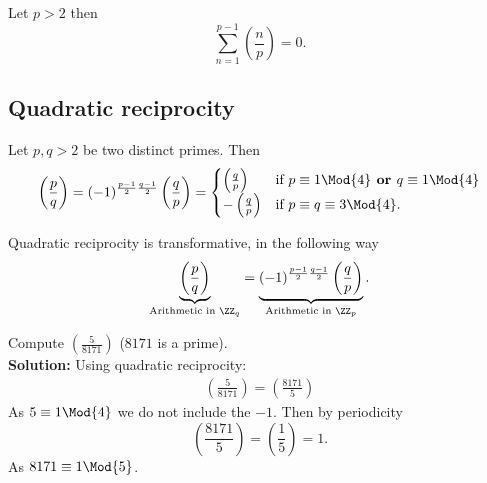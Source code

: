 \documentclass[12pt, a4paper]{article}
\begin{document}
\begin{theorem}
    Let \(p>2\) then
    \[\sum_{n=1}^{p-1} \left( \frac{n}{p} \right) =0.\]
\end{theorem}

\subsection{Quadratic reciprocity}

\begin{mdthm}
    Let \(p,q>2\) be two distinct primes. Then
    \[\begin{aligned}
        \left( \frac{p}{q} \right) = (-1)^{\frac{p-1}{2} \frac{q-1}{2}} \left( \frac{q}{p} \right) = 
        \begin{cases}
            \left( \frac{q}{p} \right) &\text{if } p \equiv 1 \Mod{4} \textbf{ or } q \equiv 1 \Mod{4} \\
            -\left( \frac{q}{p} \right) &\text{if } p \equiv q \equiv 3 \Mod{4}.
        \end{cases}
    \end{aligned}\]
\end{mdthm}

\begin{mdremark}
    Quadratic reciprocity is transformative, in the following way
    \[
        \underbrace{\left( \frac{p}{q} \right)}_{\text{Arithmetic in } \ZZ_q} = \underbrace{(-1)^{\frac{p-1}{2} \frac{q-1}{2}} \left( \frac{q}{p} \right)}_{\text{Arithmetic in } \ZZ_p}.
    \]
\end{mdremark}

\begin{example}
    Compute \(\left( \frac{5}{8171} \right)\) (\(8171\) is a prime). \\
    \textbf{Solution:} Using quadratic reciprocity:
    \[\begin{aligned}
        \left( \frac{5}{8171} \right) = \left( \frac{8171}{5} \right)
    \end{aligned}\]
    As \(5 \equiv 1 \Mod{4}\) we do not include the \(-1\). Then by periodicity
    \[\left( \frac{8171}{5} \right) = \left( \frac{1}{5} \right) =1.\]
    As \(8171 \equiv 1 \Mod{5}\).
\end{example}
\end{document}
